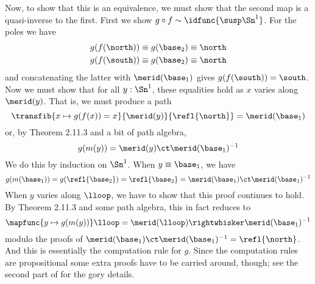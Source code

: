 Now, to show that this is an equivalence, we must show that the second map is a
quasi-inverse to the first.  First we show $g \circ f \sim
\idfunc{\susp\Sn^{1}}$.  For the poles we have
\begin{align*}
  g(f(\north)) &\equiv g(\base_{2}) \equiv \north \\
  g(f(\south)) &\equiv g(\base_{2}) \equiv \north
\end{align*}
and concatenating the latter with $\merid(\base_{1})$ gives $g(f(\south)) =
\south$.  Now we must show that for all $y : \Sn^{1}$, these equalities hold as
$x$ varies along $\merid(y)$.  That is, we must produce a path
\[
  \transfib{x \mapsto g(f(x)) = x}{\merid(y)}{\refl{\north}} = \merid(\base_{1})
\]
or, by Theorem 2.11.3 and a bit of path algebra,
\[
  g(m(y))
  =
  \merid(y) \ct \merid(\base_{1})^{-1}
\]
We do this by induction on $\Sn^{1}$.  When $y \equiv \base_{1}$, we have
\[
  g(m(\base_{1})) 
  = 
  g(\refl{\base_{2}}) 
  =
  \refl{\base_{2}}
  =
  \merid(\base_{1}) \ct \merid(\base_{1})^{-1}
\]
When $y$ varies along $\lloop$, we have to show that this proof continues to
hold.  By Theorem 2.11.3 and some path algebra, this in fact
reduces to
\[
  \mapfunc{y \mapsto g(m(y))} \lloop
  =
  \merid(\lloop) \rightwhisker \merid(\base_{1})^{-1}
\]
modulo the proofs of $\merid(\base_{1}) \ct \merid(\base_{1})^{-1} =
\refl{\north}$.  And this is essentially the computation rule for $g$.  Since
the computation rules are propositional some extra proofs have to be carried
around, though; see the second part of  for the gory details.


